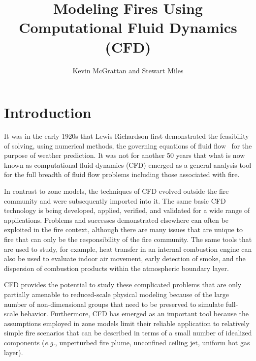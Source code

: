 \documentclass[graybox]{svmult}
\begin{document}


\title*{Modeling Fires Using Computational Fluid Dynamics (CFD)}

\author{Kevin McGrattan and Stewart Miles}


\maketitle


\section{Introduction}

It was in the early 1920s that Lewis Richardson first demonstrated the feasibility of solving, using numerical methods, the governing equations of fluid flow~\cite{Richardson}  for the purpose of weather prediction. It was not for another 50 years that what is now known as computational fluid dynamics (CFD) emerged as a general analysis tool for the full breadth of fluid flow problems including those associated with fire.

In contrast to zone models, the techniques of CFD evolved outside the fire community and were subsequently imported into it. The same basic CFD technology is being developed, applied, verified, and validated for a wide range of applications. Problems and successes demonstrated elsewhere can often be exploited in the fire context, although there are many issues that are unique to fire that can only be the responsibility of the fire community. The same tools that are used to study, for example, heat transfer in an internal combustion engine can also be used to evaluate indoor air movement, early detection of smoke, and the dispersion of combustion products within the atmospheric boundary layer.

CFD provides the potential to study these complicated problems that are only partially amenable to reduced-scale physical modeling because of the large number of non-dimensional groups that need to be preserved to simulate full-scale behavior. Furthermore, CFD has emerged as an important tool because the assumptions employed in zone models limit their reliable application to relatively simple fire scenarios that can be described in terms of a small number of idealized components ({\em e.g.}, unperturbed fire plume, unconfined ceiling jet, uniform hot gas layer).
\end{document}
